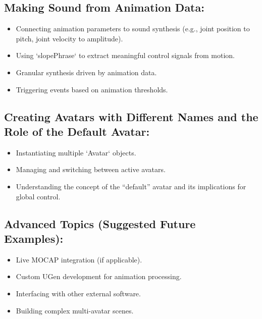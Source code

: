 \documentclass[11pt]{article}
\begin{document}
\subsection{\textbf{Making Sound from Animation Data}:}
\label{sec:org8dc5387}
\begin{itemize}
\item Connecting animation parameters to sound synthesis (e.g., joint position to pitch, joint velocity to amplitude).
\item Using `slopePhrase` to extract meaningful control signals from motion.
\item Granular synthesis driven by animation data.
\item Triggering events based on animation thresholds.
\end{itemize}
\subsection{\textbf{Creating Avatars with Different Names and the Role of the Default Avatar}:}
\label{sec:orgd3c35c8}
\begin{itemize}
\item Instantiating multiple `Avatar` objects.
\item Managing and switching between active avatars.
\item Understanding the concept of the ``default'' avatar and its implications for global control.
\end{itemize}
\subsection{\textbf{Advanced Topics (Suggested Future Examples)}:}
\label{sec:org2db0916}
\begin{itemize}
\item Live MOCAP integration (if applicable).
\item Custom UGen development for animation processing.
\item Interfacing with other external software.
\item Building complex multi-avatar scenes.
\end{itemize}
\end{document}
